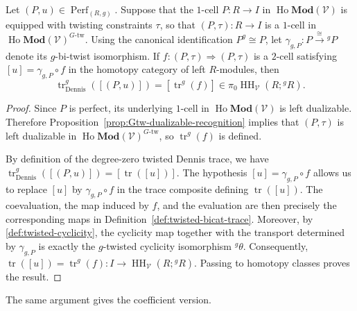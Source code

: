 \documentclass[11pt,oneside]{amsart}
\DeclareMathOperator{\Ho}{Ho}
\DeclareMathOperator{\HH}{HH}
\DeclareMathOperator{\Perf}{Perf}
\numberwithin{equation}{section}
\numberwithin{figure}{section}
\theoremstyle{plain}
\theoremstyle{definition}
\theoremstyle{remark}
\begin{document}
\begin{prop}\label{prop:algebraic_dennis_trace_recovery}
Let $(P,u)\in\Perf_{(R,g)}$. Suppose that the $1$-cell $P\colon R\to I$ in $\Ho\mathbf{Mod}(\mathcal V)$ is equipped with twisting constraints $\tau$, so that 
\(
(P,\tau)\colon R\to I
\)
is a $1$-cell in $\Ho\mathbf{Mod}(\mathcal V)^{G\text{-tw}}$. Using the canonical identification $P^g\cong P$, let 
\(
\gamma_{g,P}\colon
P\xrightarrow{\cong}{}^gP
\)
denote its $g$-bi-twist isomorphism. If 
\(
f\colon(P,\tau)\Rightarrow(P,\tau)
\)
is a $2$-cell satisfying 
\(
[u]=\gamma_{g,P}\circ f
\)
in the homotopy category of left $R$-modules, then 
\[
\operatorname{tr}_{\mathrm{Dennis}}^g([(P,u)])
= [\operatorname{tr}^g(f)]
\in
\pi_0\HH_{\mathcal V}(R;{}^gR).
\]
\end{prop}
\begin{proof}
Since $P$ is perfect, its underlying $1$-cell in $\Ho\mathbf{Mod}(\mathcal V)$ is left dualizable. Therefore Proposition~\ref{prop:Gtw-dualizable-recognition} implies that $(P,\tau)$ is left dualizable in $\Ho\mathbf{Mod}(\mathcal V)^{G\text{-tw}}$, so $\operatorname{tr}^g(f)$ is defined.

By definition of the degree-zero twisted Dennis trace, we have
\(
\operatorname{tr}_{\mathrm{Dennis}}^g([(P,u)]) = [\operatorname{tr}([u])].
\)
The hypothesis $[u]=\gamma_{g,P}\circ f$ allows us to replace $[u]$ by $\gamma_{g,P}\circ f$ in the trace composite defining $\operatorname{tr}([u])$. The coevaluation, the map induced by $f$, and the evaluation are then precisely the corresponding maps in Definition~\ref{def:twisted-bicat-trace}. Moreover, by \eqref{def:twisted-cyclicity}, the cyclicity map together with the transport determined by $\gamma_{g,P}$ is exactly the $g$-twisted cyclicity isomorphism ${}^g\theta$. Consequently, 
\(
\operatorname{tr}([u])
= \operatorname{tr}^g(f)\colon
I\to
\HH_{\mathcal V}(R;{}^gR).
\)
Passing to homotopy classes proves the result.
\end{proof}
The same argument gives the coefficient version.
\end{document}
